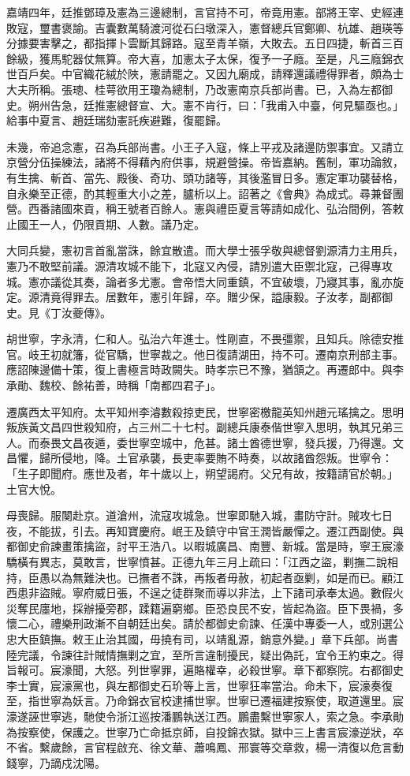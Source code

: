 \begin{pinyinscope}
嘉靖四年，廷推鄧璋及憲為三邊總制，言官持不可，帝竟用憲。部將王宰、史經連敗寇，璽書褒諭。吉囊數萬騎渡河從石臼墩深入，憲督總兵官鄭卿、杭雄、趙瑛等分據要害擊之，都指揮卜雲斷其歸路。寇至青羊嶺，大敗去。五日四捷，斬首三百餘級，獲馬駝器仗無算。帝大喜，加憲太子太保，復予一子廕。至是，凡三廕錦衣世百戶矣。中官織花絨於陜，憲請罷之。又因九廟成，請釋還議禮得罪者，頗為士大夫所稱。張璁、桂萼欲用王瓊為總制，乃改憲南京兵部尚書。已，入為左都御史。朔州告急，廷推憲總督宣、大。憲不肯行，曰：「我甫入中臺，何見驅亟也。」給事中夏言、趙廷瑞劾憲託疾避難，復罷歸。

未幾，帝追念憲，召為兵部尚書。小王子入寇，條上平戎及諸邊防禦事宜。又請立京營分伍操練法，諸將不得藉內府供事，規避營操。帝皆嘉納。舊制，軍功論敘，有生擒、斬首、當先、殿後、奇功、頭功諸等，其後濫冒日多。憲定軍功襲替格，自永樂至正德，酌其輕重大小之差，臚析以上。詔著之《會典》為成式。尋兼督團營。西番諸國來貢，稱王號者百餘人。憲與禮臣夏言等請如成化、弘治間例，答敕止國王一人，仍限貢期、人數。議乃定。

大同兵變，憲初言首亂當誅，餘宜散遣。而大學士張孚敬與總督劉源清力主用兵，憲乃不敢堅前議。源清攻城不能下，北寇又內侵，請別遣大臣禦北寇，己得專攻城。憲亦議從其奏，論者多尤憲。會帝悟大同重鎮，不宜破壞，乃寢其事，亂亦旋定。源清竟得罪去。居數年，憲引年歸，卒。贈少保，謚康毅。子汝孝，副都御史。見《丁汝夔傳》。

胡世寧，字永清，仁和人。弘治六年進士。性剛直，不畏彊禦，且知兵。除德安推官。岐王初就籓，從官驕，世寧裁之。他日復請湖田，持不可。遷南京刑部主事。應詔陳邊備十策，復上書極言時政闕失。時孝宗已不豫，猶頷之。再遷郎中。與李承勛、魏校、餘祐善，時稱「南都四君子」。

遷廣西太平知府。太平知州李濬數殺掠吏民，世寧密檄龍英知州趙元瑤擒之。思明叛族黃文昌四世殺知府，占三州二十七村。副總兵康泰偕世寧入思明，執其兄弟三人。而泰畏文昌夜遁，委世寧空城中，危甚。諸土酋德世寧，發兵援，乃得還。文昌懼，歸所侵地，降。土官承襲，長吏率要賄不時奏，以故諸酋怨叛。世寧令：「生子即聞府。應世及者，年十歲以上，朔望謁府。父兄有故，按籍請官於朝。」土官大悅。

母喪歸。服闋赴京。道滄州，流寇攻城急。世寧即馳入城，畫防守計。賊攻七日夜，不能拔，引去。再知寶慶府。岷王及鎮守中官王潤皆嚴憚之。遷江西副使。與都御史俞諫畫策擒盜，討平王浩八。以暇城廣昌、南豐、新城。當是時，寧王宸濠驕橫有異志，莫敢言，世寧憤甚。正德九年三月上疏曰：「江西之盜，剿撫二說相持，臣愚以為無難決也。已撫者不誅，再叛者毋赦，初起者亟剿，如是而已。顧江西患非盜賊。寧府威日張，不逞之徒群聚而導以非法，上下諸司承奉太過。數假火災奪民廛地，採辦擾旁郡，蹂籍遍窮鄉。臣恐良民不安，皆起為盜。臣下畏禍，多懷二心，禮樂刑政漸不自朝廷出矣。請於都御史俞諫、任漢中專委一人，或別選公忠大臣鎮撫。敕王止治其國，毋撓有司，以靖亂源，銷意外變。」章下兵部。尚書陸完議，令諫往計賊情撫剿之宜，至所言違制擾民，疑出偽託，宜令王約束之。得旨報可。宸濠聞，大怒。列世寧罪，遍賂權幸，必殺世寧。章下都察院。右都御史李士實，宸濠黨也，與左都御史石玠等上言，世寧狂率當治。命未下，宸濠奏復至，指世寧為妖言。乃命錦衣官校逮捕世寧。世寧已遷福建按察使，取道還里。宸濠遂誣世寧逃，馳使令浙江巡按潘鵬執送江西。鵬盡繫世寧家人，索之急。李承勛為按察使，保護之。世寧乃亡命抵京師，自投錦衣獄。獄中三上書言宸濠逆狀，卒不省。繫歲餘，言官程啟充、徐文華、蕭鳴鳳、邢寰等交章救，楊一清復以危言動錢寧，乃謫戍沈陽。


\end{pinyinscope}
